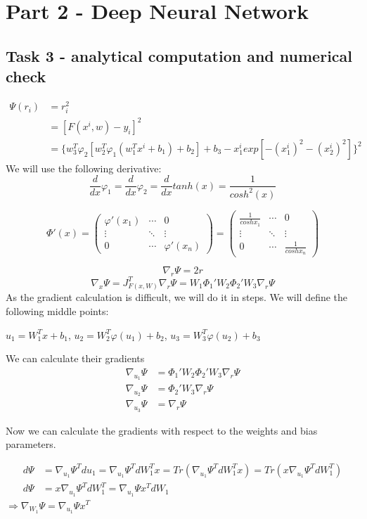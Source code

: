 \documentclass[12pt]{scrartcl}
\begin{document}
\section*{Part 2 - Deep Neural Network}
\subsection*{Task 3 - analytical computation and numerical check}
\begin{align*}
\Psi(r_i)&=r_i^2\\
&=[F(x^i,w)-y_i]^2\\
&=\{w_3^T\varphi_2[w_2^T\varphi_1(w_1^Tx^i+b_1)+b_2]+b_3 -x_1^i exp[-(x_1^i)^2-(x_2^i)^2]\}^2
\end{align*}
We will use the following derivative:
$$\frac{d}{dx}\varphi_1=\frac{d}{dx}\varphi_2=\frac{d}{dx}tanh(x)=
\frac{1}{cosh^2(x)}$$

$$\Phi'(x)=
\begin{pmatrix}
\varphi'(x_1) & \cdots & 0 \\
\vdots & \ddots & \vdots \\
0 & \cdots & \varphi'(x_n)
\end{pmatrix}
=
\begin{pmatrix}
\frac{1}{cosh x_1} & \cdots & 0 \\
\vdots & \ddots & \vdots \\
0 & \cdots & \frac{1}{cosh x_n}
\end{pmatrix}$$

$$\nabla_r \Psi = 2r$$
$$\nabla_x \Psi = J^T_{F(x, W)}\nabla_r \Psi = 
W_1\Phi_1'W_2\Phi_2'W_3\nabla_r \Psi$$
As the gradient calculation is difficult, we will do it in steps. We will define the following middle points:
\begin{center}
$u_1 = W_1^Tx+b_1$, $u_2 = W_2^T\varphi(u_1)+b_2$, $u_3 = W_3^T\varphi(u_2)+b_3$
\end{center}
We can calculate their gradients
\begin{align*}
\nabla_{u_1} \Psi &= \Phi_1'W_2\Phi_2'W_3\nabla_r \Psi \\
\nabla_{u_2} \Psi &= \Phi_2'W_3\nabla_r \Psi \\
\nabla_{u_3} \Psi &= \nabla_r \Psi
\end{align*}

Now we can calculate the gradients with respect to the weights and bias parameters.

\begin{align*}
d\Psi &= \nabla_{u_1}\Psi^Tdu_1=\nabla_{u_1}\Psi^T dW_1^Tx
=Tr(\nabla_{u_1}\Psi^T dW_1^Tx)=Tr(x\nabla_{u_1}\Psi^T dW_1^T)\\
d\Psi &=x\nabla_{u_1}\Psi^T dW_1^T = \nabla_{u_1}\Psi x^TdW_1 
\end{align*}
$\Rightarrow \nabla_{W_1}\Psi = \nabla_{u_1}\Psi x^T$
\begin{center}
\end{center}
\end{document}
